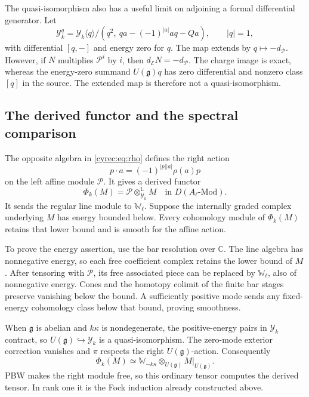 The quasi-isomorphism also has a useful limit on adjoining a formal
differential generator. Let
\[
 \mathcal Y_k^q=\mathcal Y_k\langle q\rangle/
     (q^2,\ qa-(-1)^{|a|}aq-Qa),
 \qquad |q|=1,
\]
with differential $[q,-]$ and energy zero for $q$.
The map extends by $q\mapsto-d_{\mathcal P}$.
However, if $N$ multiplies $\mathcal P^i$ by $i$, then
$d_{\mathcal E}N=-d_{\mathcal P}$. The charge image is exact,
whereas the energy-zero summand $U(\mathfrak g)q$ has zero
differential and nonzero class $[q]$ in the source.
The extended map is therefore not a quasi-isomorphism.

\subsection{The derived functor and the spectral comparison}

The opposite algebra in \eqref{cyrec:eq:rho} defines the right
action
\[
 p\cdot a=(-1)^{|p||a|}\rho(a)p
\]
on the left affine module $\mathcal P$. It gives a derived functor
\begin{equation}\label{cyrec:eq:derived-functor}
 \Phi_k(M)=\mathcal P\otimes^{\mathbb L}_{\mathcal Y_k}M
       \quad\text{in }D(A_\ell\text{-}\mathrm{Mod}).
\end{equation}
It sends the regular line module to $\mathbb W_\ell$.
Suppose the internally graded complex underlying $M$ has energy
bounded below. Every cohomology module of $\Phi_k(M)$ retains
that lower bound and is smooth for the affine action.

To prove the energy assertion, use the bar resolution over
$\mathbb C$. The line algebra has nonnegative energy, so each
free coefficient complex retains the lower bound of $M$.
After tensoring with $\mathcal P$, its free associated piece
can be replaced by $\mathbb W_\ell$, also of nonnegative
energy. Cones and the homotopy colimit of the finite bar stages
preserve vanishing below the bound. A sufficiently positive mode
sends any fixed-energy cohomology class below that bound, proving
smoothness.

When $\mathfrak g$ is abelian and $k\kappa$ is nondegenerate,
the positive-energy pairs in $\mathcal Y_k$ contract, so
$U(\mathfrak g)\hookrightarrow\mathcal Y_k$ is a quasi-isomorphism.
The zero-mode exterior correction vanishes and $\pi$ respects
the right $U(\mathfrak g)$-action. Consequently
\[
 \Phi_k(M)\simeq\mathbb W_{-k\kappa}
                         \otimes_{U(\mathfrak g)}M|_{U(\mathfrak g)}.
\]
PBW makes the right module free, so this ordinary tensor computes
the derived tensor. In rank one it is the Fock induction already
constructed above.

